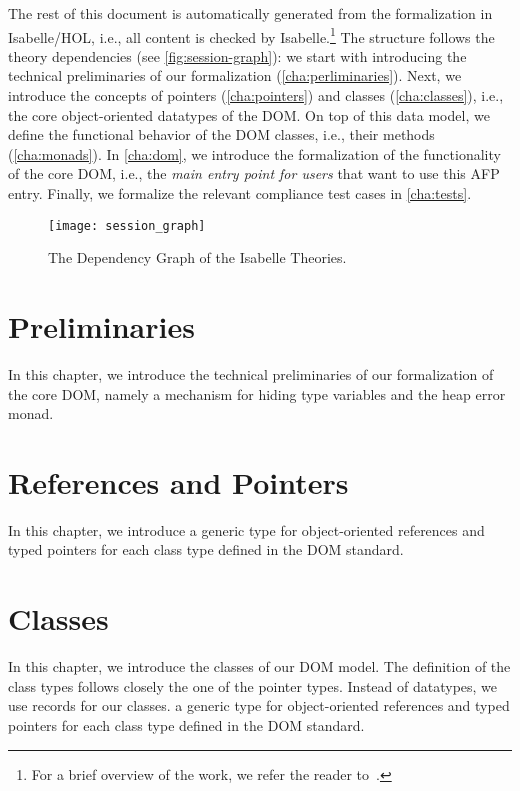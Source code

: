 \documentclass[10pt,DIV16,a4paper,abstract=true,twoside=semi,openright]
{scrreprt}
\begin{document}
The rest of this document is automatically generated from the
formalization in Isabelle/HOL, i.e., all content is checked by
Isabelle.\footnote{For a brief overview of the work, we refer the
  reader to~\cite{brucker.ea:core-dom:2018}.} The structure follows
the theory dependencies (see \autoref{fig:session-graph}): we start
with introducing the technical preliminaries of our formalization
(\autoref{cha:perliminaries}).  Next, we introduce the concepts of
pointers (\autoref{cha:pointers}) and classes (\autoref{cha:classes}),
i.e., the core object-oriented datatypes of the DOM. On top of this
data model, we define the functional behavior of the DOM classes,
i.e., their methods (\autoref{cha:monads}). In \autoref{cha:dom}, we
introduce the formalization of the functionality of the core DOM,
i.e., the \emph{main entry point for users} that want to use this AFP
entry. Finally, we formalize the relevant compliance test cases in
\autoref{cha:tests}.

\begin{figure}
  \centering
  \texttt{[image: session\_graph]}
  \caption{The Dependency Graph of the Isabelle Theories.\label{fig:session-graph}}
\end{figure}

\clearpage

\chapter{Preliminaries}
\label{cha:perliminaries}
In this chapter, we introduce the technical preliminaries of our
formalization of the core DOM, namely a mechanism for hiding type
variables and the heap error monad.



\chapter{References and Pointers}
\label{cha:pointers}
In this chapter, we introduce a generic type for object-oriented
references and typed pointers for each class type defined in the DOM
standard. 








\chapter{Classes}
\label{cha:classes}
In this chapter, we introduce the classes of our DOM model. 
The definition of the class types follows closely the one of the
pointer types.  Instead of datatypes, we use records for our classes.
a generic type for object-oriented references and typed pointers for
each class type defined in the DOM standard.






\end{document}
